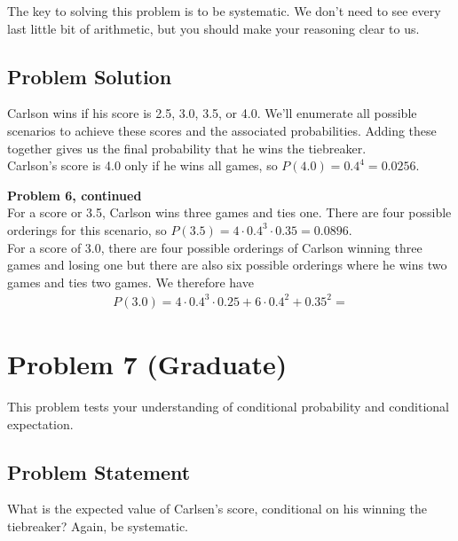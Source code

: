 \documentclass[12pt]{article}
\theoremstyle{definition}
\begin{document}
\bigskip
The key to solving this problem is to be systematic. We don't need to see every last little bit of arithmetic, but you should make your reasoning clear to us.


\subsection*{Problem Solution}

Carlson wins if his score is 2.5, 3.0, 3.5, or 4.0. We'll enumerate all possible scenarios to achieve these scores and the associated probabilities. Adding these together gives us the final probability that he wins the tiebreaker.\\

Carlson's score is 4.0 only if he wins all games, so $P(4.0) = 0.4^4 = 0.0256$.

\newpage
\noindent
{\bf Problem 6, continued}\\

For a score or 3.5, Carlson wins three games and ties one. There are four possible orderings for this scenario, so $P(3.5) = 4 \cdot 0.4^3 \cdot 0.35 = 0.0896$.\\

For a score of 3.0, there are four possible orderings of Carlson winning three games and losing one but there are also six possible orderings where he wins two games and ties two games. We therefore have
\begin{align*}
P(3.0) = 4 \cdot 0.4^3 \cdot 0.25 + 6 \cdot 0.4^2 + 0.35^2 = 
\end{align*}



\newpage
\section*{Problem 7 (Graduate)}

This problem tests your understanding of conditional probability and conditional expectation.

\subsection*{Problem Statement}

What is the expected value of Carlsen's score, conditional on his winning the tiebreaker? Again, be systematic.
\end{document}
